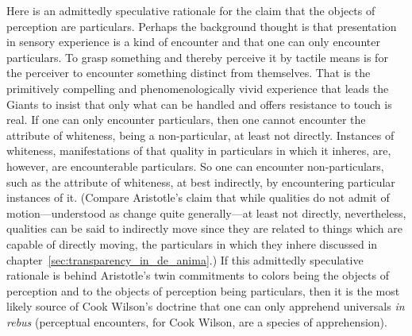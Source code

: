 Here is an admittedly speculative rationale for the claim that the objects of perception are particulars. Perhaps the background thought is that presentation in sensory experience is a kind of encounter and that one can only encounter particulars. To grasp something and thereby perceive it by tactile means is for the perceiver to encounter something distinct from themselves. That is the primitively compelling and phenomenologically vivid experience that leads the Giants to insist that only what can be handled and offers resistance to touch is real. If one can only encounter particulars, then one cannot encounter the attribute of whiteness, being a non-particular, at least not directly. Instances of whiteness, manifestations of that quality in particulars in which it inheres, are, however, are encounterable particulars. So one can encounter non-particulars, such as the attribute of whiteness, at best indirectly, by encountering particular instances of it. (Compare Aristotle's claim that while qualities do not admit of motion---understood as change quite generally---at least not directly, nevertheless, qualities can be said to indirectly move since they are related to things which are capable of directly moving, the particulars in which they inhere discussed in chapter~\ref{sec:transparency_in_de_anima}.) If this admittedly speculative rationale is behind Aristotle's twin commitments to colors being the objects of perception and to the objects of perception being particulars, then it is the most likely source of Cook Wilson's \citeyearpar[336]{Cook-Wilson:1926sf} doctrine that one can only apprehend universals \emph{in rebus} (perceptual encounters, for Cook Wilson, are a species of apprehension).


